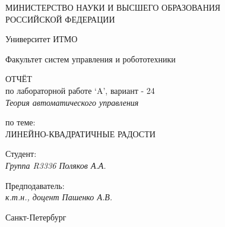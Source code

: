 \thispagestyle{empty}

\begin{center}
    МИНИСТЕРСТВО НАУКИ И ВЫСШЕГО ОБРАЗОВАНИЯ \\ РОССИЙСКОЙ ФЕДЕРАЦИИ

    \vspace{20pt}

    Университет ИТМО

    \vspace{20pt}

    Факультет систем управления и робототехники
\end{center}

\vfill
\begin{center}
    ОТЧЁТ \\  
    по лабораторной работе  `A', вариант - 24 \\ 
    \vspace{10pt}
    \textit{Теория автоматического управления}

    \vspace{20pt}

    по теме: \\
    \uppercase{Линейно-квадратичные радости}
\end{center}

\vfill

\noindent Студент: \\
\textit{Группа R3336 \hfill Поляков А.А.}


    \vspace{20pt}

    \noindent Предподаватель: \\
    \textit{к.т.н., доцент \hfill  Пашенко А.В.}

\vfill

\begin{center}
    Санкт-Петербург \\ \the\year
\end{center}
